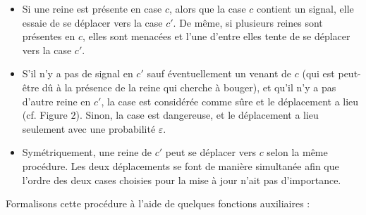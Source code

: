 \documentclass[11pt, openany]{article}
\begin{document}
\begin{itemize}

\item{ Si une reine est présente en case $c$, alors que la case $c$ contient un signal, elle essaie de se déplacer vers la case $c'$. De même, si plusieurs reines sont présentes en $c$, elles sont menacées et l'une d'entre elles tente de se déplacer vers la case $c'$.}

\item{ S'il n'y a pas de signal en $c'$ sauf éventuellement un venant de $c$ (qui est peut-être dû à la présence de la reine qui cherche à bouger), et qu'il n'y a pas d'autre reine en $c'$, la case est considérée comme sûre et le déplacement a lieu (cf. Figure $2$). Sinon, la case est dangereuse, et le déplacement a lieu seulement avec une probabilité $\varepsilon$.
}

\item{ Symétriquement, une reine de $c'$ peut se déplacer vers $c$ selon la même procédure. Les deux déplacements se font de manière simultanée afin que l'ordre des deux cases choisies pour la mise à jour n'ait pas d'importance.}

\end{itemize}
\medskip
Formalisons cette procédure à l'aide de quelques fonctions auxiliaires :  
\end{document}
